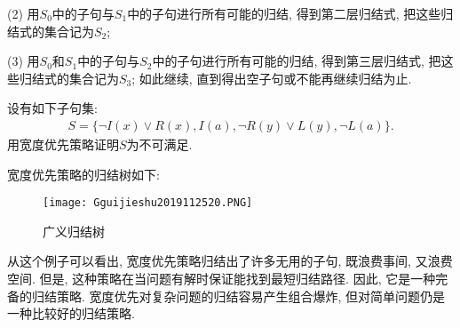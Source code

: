 (2) 用$S_0$中的子句与$S_1$中的子句进行所有可能的归结, 得到第二层归结式, 把这些归结式的集合记为$S_2$;

(3) 用$S_0$和$S_1$中的子句与$S_2$中的子句进行所有可能的归结, 得到第三层归结式, 把这些归结式的集合记为$S_3$;
如此继续, 直到得出空子句或不能再继续归结为止.
\begin{example}
设有如下子句集:
\begin{align}
  S=\{\neg I(x)\vee R(x),  I(a), \neg R(y)\vee L(y), \neg L(a)\}.
\end{align}
用宽度优先策略证明$S$为不可满足.
\end{example}

宽度优先策略的归结树如下:
\begin{figure}[H]
\centering
\texttt{[image: Gguijieshu2019112520.PNG]}
\caption{广义归结树}
\label{AI32fig20}
\end{figure}
从这个例子可以看出, 宽度优先策略归结出了许多无用的子句, 既浪费事间, 又浪费空间. 但是, 这种策略在当问题有解时保证能找到最短归结路径.
因此, 它是一种完备的归结策略. 宽度优先对复杂问题的归结容易产生组合爆炸, 但对简单问题仍是一种比较好的归结策略.
